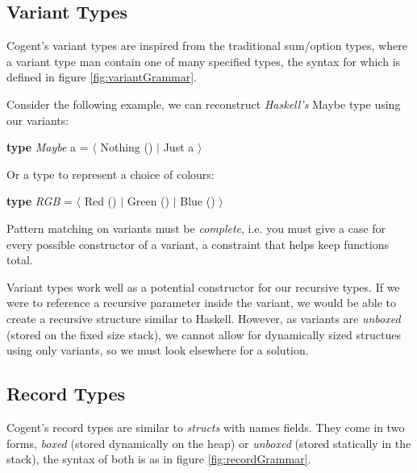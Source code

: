 \subsection{Variant Types}

Cogent's variant types are inspired from the traditional sum/option types, where a variant type man contain
one of many specified types, the syntax for which is defined in figure \ref{fig:variantGrammar}.

Consider the following example, we can reconstruct \textit{Haskell's} Maybe type using our variants:

\begin{center}
    \textbf{type} \textit{Maybe} a = $\langle$ Nothing () $\vert$ Just a $\rangle$
\end{center}

Or a type to represent a choice of colours:

\begin{center}
    \textbf{type} \textit{RGB} = $\langle$ Red () $\vert$ Green () $\vert$ Blue () $\rangle$
\end{center}

Pattern matching on variants must be \textit{complete}, i.e. you must give a case for every possible constructor
of a variant, a constraint that helps keep functions total.

Variant types work well as a potential constructor for our recursive types. If we were to reference a
recursive parameter inside the variant, we would be able to create a recursive structure similar to Haskell.
However, as variants are \textit{unboxed} (stored on the fixed size stack), we cannot allow for dynamically sized structues
using only variants, so we must look elsewhere for a solution.

\subsection{Record Types}

Cogent's record types are similar to \textit{structs} with names fields. They come in two forms, \textit{boxed}
(stored dynamically on the heap) or \textit{unboxed} (stored statically in the stack), the syntax of both is
as in figure \ref{fig:recordGrammar}.

